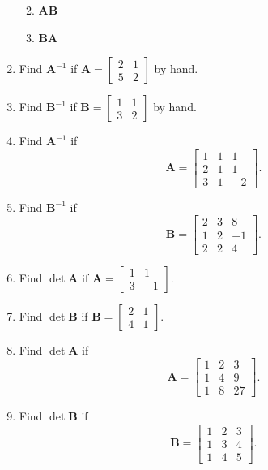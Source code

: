 \documentclass[
]{book}
\providecommand{\tightlist}{%
  \setlength{\itemsep}{0pt}\setlength{\parskip}{0pt}}
\theoremstyle{definition}
\theoremstyle{definition}
\theoremstyle{definition}
\theoremstyle{definition}
\theoremstyle{remark}
\begin{document}
\begin{enumerate}
  \begin{enumerate}
  \def\labelenumii{\alph{enumii}.}
  \tightlist
  \item
    \(\mathbf{A}\mathbf{B}\)
  \item
    \(\mathbf{B}\mathbf{A}\)
  \end{enumerate}
\item
  Find \(\mathbf{A}^{-1}\) if \(\mathbf{A}=\begin{bmatrix} 2 & 1\\5 & 2\end{bmatrix}\) by hand.
\item
  Find \(\mathbf{B}^{-1}\) if \(\mathbf{B}=\begin{bmatrix} 1 & 1\\3 & 2\end{bmatrix}\) by hand.
\item
  Find \(\mathbf{A}^{-1}\) if
  \[\mathbf{A}=\begin{bmatrix} 1 & 1 & 1\\2 & 1 & 1\\3 & 1 & -2\end{bmatrix}.\]
\item
  Find \(\mathbf{B}^{-1}\) if
  \[\mathbf{B}=\begin{bmatrix} 2 & 3 & 8\\1 & 2 & -1\\2 & 2 & 4\end{bmatrix}.\]
\item
  Find \(\det\mathbf{A}\) if \(\mathbf{A}=\begin{bmatrix} 1 & 1\\3 & -1\end{bmatrix}.\)
\item
  Find \(\det\mathbf{B}\) if \(\mathbf{B}=\begin{bmatrix} 2 & 1\\4 & 1\end{bmatrix}.\)
\item
  Find \(\det\mathbf{A}\) if
  \[\mathbf{A}=\begin{bmatrix} 1 & 2 & 3\\1 & 4 & 9\\1 & 8 & 27\end{bmatrix}.\]
\item
  Find \(\det\mathbf{B}\) if
  \[\mathbf{B}=\begin{bmatrix} 1 & 2 & 3\\1 & 3 & 4\\1 & 4 & 5\end{bmatrix}.\]

\end{enumerate}
\end{document}
